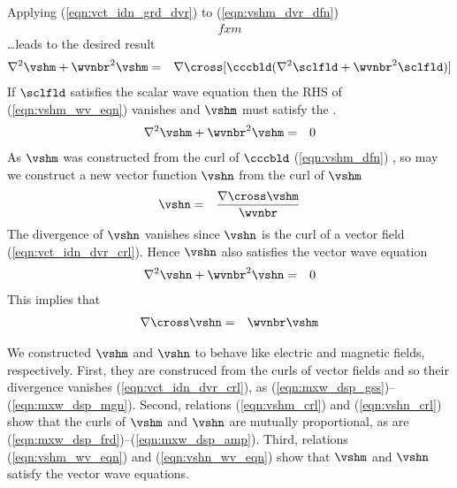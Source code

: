 \documentclass[12pt]{article}
\begin{document}
Applying (\ref{eqn:vct_idn_grd_dvr}) to (\ref{eqn:vshm_dvr_dfn})
\begin{eqnarray}
fxm
\label{eqn:vshm_wv_eqn_drv_3}
\end{eqnarray}
\ldots leads to the desired result
\begin{eqnarray}
\nabla^{2} \vshm + \wvnbr^{2} \vshm & = & 
\nabla \cross [ \cccbld ( \nabla^{2} \sclfld + \wvnbr^{2} \sclfld ) ]
\label{eqn:vshm_wv_eqn_inh}
\end{eqnarray}
If $\sclfld$ satisfies the scalar wave equation then the RHS of
(\ref{eqn:vshm_wv_eqn}) vanishes and $\vshm$ must satisfy the
.
\begin{eqnarray}
\nabla^{2} \vshm + \wvnbr^{2} \vshm & = & 0
\label{eqn:vshm_wv_eqn}
\end{eqnarray}
As $\vshm$ was constructed from the curl of $\cccbld$
(\ref{eqn:vshm_dfn}) , so may we construct a new vector function
$\vshn$ from the curl of $\vshm$ 
\begin{eqnarray}
\vshn & = & \frac{\nabla \cross \vshm}{\wvnbr}
\label{eqn:vshn_dfn}
\label{eqn:vshm_crl}
\end{eqnarray}
The divergence of $\vshn$ vanishes since $\vshn$ is the curl of a
vector field (\ref{eqn:vct_idn_dvr_crl}).
Hence $\vshn$ also satisfies the vector wave equation
\begin{eqnarray}
\nabla^{2} \vshn + \wvnbr^{2} \vshn & = & 0
\label{eqn:vshn_wv_eqn}
\end{eqnarray}
This implies that
\begin{eqnarray}
\nabla \cross \vshn & = & \wvnbr \vshm
\label{eqn:vshn_crl}
\end{eqnarray}

We constructed $\vshm$ and $\vshn$ to behave like electric and
magnetic fields, respectively.  
First, they are construced from the curls of vector fields and
so their divergence vanishes (\ref{eqn:vct_idn_dvr_crl}), as 
(\ref{eqn:mxw_dsp_gss})--(\ref{eqn:mxw_dsp_mgn}).
Second, relations (\ref{eqn:vshm_crl}) and (\ref{eqn:vshn_crl}) show
that the curls of $\vshm$ and $\vshn$ are mutually proportional, as
are (\ref{eqn:mxw_dsp_frd})--(\ref{eqn:mxw_dsp_amp}).
Third, relations (\ref{eqn:vshm_wv_eqn}) and (\ref{eqn:vshn_wv_eqn})
show that $\vshm$ and $\vshn$ satisfy the vector wave equations.
\end{document}
